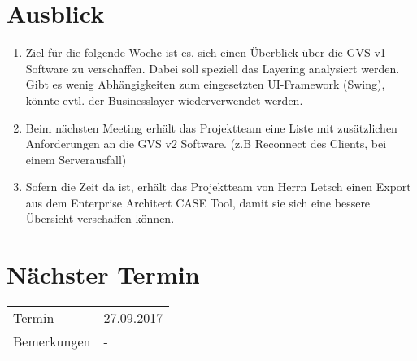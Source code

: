 \documentclass[11pt, a4paper,oneside]{scrartcl}
\begin{document}
\section{Ausblick}
\begin{enumerate}
	\item Ziel für die folgende Woche ist es, sich einen Überblick über die GVS v1 Software zu verschaffen. Dabei soll speziell das Layering analysiert werden. Gibt es wenig Abhängigkeiten zum eingesetzten UI-Framework (Swing), könnte evtl. der Businesslayer wiederverwendet werden.
	\item Beim nächsten Meeting erhält das Projektteam eine Liste mit zusätzlichen Anforderungen an die GVS v2 Software. (z.B Reconnect des Clients, bei einem Serverausfall)
	\item Sofern die Zeit da ist, erhält das Projektteam von Herrn Letsch einen Export aus dem Enterprise Architect CASE Tool, damit sie sich eine bessere Übersicht verschaffen können.
\end{enumerate}

\section{Nächster Termin}
\begin{tabu} to \linewidth {l X }
	\toprule
	Termin & 27.09.2017 \\
	Bemerkungen & - \\
	\bottomrule
\end{tabu}
\end{document}

